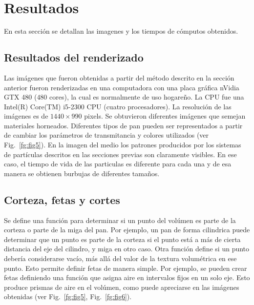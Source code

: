 \documentclass[oneside,a4paper,english,links]{amca}
\begin{document}
\section{Resultados}

En esta sección se detallan las imagenes y los tiempos de
cómputos obtenidos. 

\subsection{Resultados del renderizado}

Las imágenes que fueron obtenidas a partir del método descrito en la
sección anterior fueron renderizadas en una computadora con una placa
gráfica nVidia GTX 480 ($480$ cores), la cual es normalmente de uso
hogareño. La CPU fue una Intel(R) Core(TM) i5-2300 CPU (cuatro
procesadores). La resolución de las imágenes es de $1440\times990$
pixels. 
Se obtuvieron diferentes imágenes que semejan materiales
horneados. Diferentes tipos de pan pueden ser representados a partir
de cambiar los parámetros de transmitancia y colores utilizados (ver
Fig.~\ref{fg:fig5}). En la imagen del medio los patrones producidos
por los sistemas de partículas descritos en las secciones previas son
claramente visibles. En ese caso, el tiempo de vida de las particulas
es diferente para cada una y de esa manera se obtienen burbujas de
diferentes tamaños.

\subsection{Corteza, fetas y cortes}

Se define una función para determinar si un punto del volúmen es parte
de la corteza o parte de la miga del pan. Por ejemplo, un pan de forma
cilindrica puede determinar que un punto es parte de la corteza si el
punto está a más de cierta distancia del eje del cilindro, y miga en
otro caso. Otra función define si un punto debería considerarse vacío,
más allá del valor de la textura volumétrica en ese punto. Esto
permite definir fetas de manera simple. Por ejemplo, se pueden crear
fetas definiendo una función que asigna aire en intervalos fijos en un
solo eje. Esto produce prismas de aire en el volúmen, como puede
apreciarse en las imágenes obtenidas (ver Fig.~\ref{fg:fig5},
Fig.~\ref{fg:fig6}). 

\end{document}
